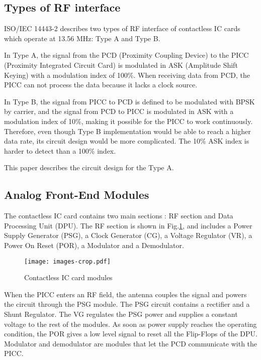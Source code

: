 \subsection{Types of RF interface}
ISO/IEC 14443-2 describes two types of RF interface of contactless IC cards which operate at 13.56 MHz: Type A and Type B. 

In Type A, the signal from the PCD (Proximity Coupling Device) to the PICC (Proximity Integrated Circuit Card) is modulated in ASK (Amplitude Shift Keying) with a modulation index of 100\%. When receiving data from PCD, the PICC can not process the data because it lacks a clock source. 

In Type B,  the signal from PICC to PCD is defined to be modulated with BPSK by carrier, and the signal from PCD to PICC is modulated in ASK with a modulation index of 10\%, making it possible for the PICC to work continuously. Therefore, even though Type B implementation would be able to reach a higher data rate, its circuit design would be more complicated. The 10\% ASK index is harder to detect than a 100\% index.

This paper describes the circuit design for the Type A. 


\subsection{Analog Front-End Modules}

The contactless IC card contains two main sections \cite{rfid_interface}: RF section and Data Processing Unit (DPU). The RF section is shown in Fig.\ref{fig:modules}, and includes a Power Supply Generator (PSG), a Clock Generator (CG), a Voltage Regulator (VR), a Power On Reset (POR), a Modulator  and a Demodulator. 

\begin{figure}[]
  \centering
  \texttt{[image: images-crop.pdf]}
  \caption{Contactless IC card modules}
  \label{fig:modules}
\end{figure}

When the PICC enters an RF field, the antenna couples the signal and powers the circuit through the PSG module. The PSG circuit contains a rectifier and a Shunt Regulator. The VG regulates the PSG power and supplies a constant voltage to the rest of the modules. As soon as power supply reaches the operating condition, the POR gives a low level signal to reset all the Flip-Flops of the DPU. Modulator and demodulator are modules that let the PCD communicate with the PICC.
